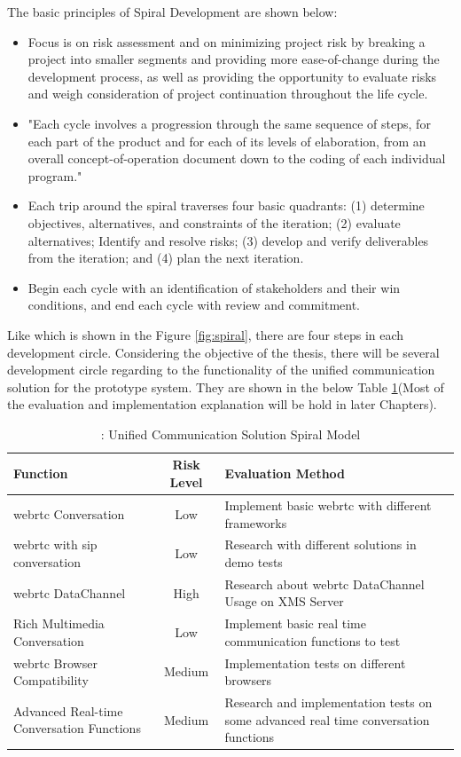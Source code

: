 \noindent The basic principles of Spiral Development are shown below\cite{wiki:software_method}:

\begin{itemize}[topsep=-1em,parsep=0em,itemsep=0em]
    \item Focus is on risk assessment and on minimizing project risk by breaking a project into smaller segments and providing more ease-of-change during the development process, as well as providing the opportunity to evaluate risks and weigh consideration of project continuation throughout the life cycle.
    \item "Each cycle involves a progression through the same sequence of steps, for each part of the product and for each of its levels of elaboration, from an overall concept-of-operation document down to the coding of each individual program."
    \item Each trip around the spiral traverses four basic quadrants: (1) determine objectives, alternatives, and constraints of the iteration; (2) evaluate alternatives; Identify and resolve risks; (3) develop and verify deliverables from the iteration; and (4) plan the next iteration.
    \item Begin each cycle with an identification of stakeholders and their win conditions, and end each cycle with review and commitment.
\end{itemize}

\par Like which is shown in the Figure \ref{fig:spiral}, there are four steps in each development circle. Considering the objective of the thesis, there will be several development circle regarding to the functionality of the unified communication solution for the prototype system. They are shown in the below Table \ref{tab:spiral}(Most of the evaluation and implementation explanation will be hold in later Chapters).

\begin{table}
\caption{\label{tab:spiral}: Unified Communication Solution Spiral Model}
\centering
\begin{tabular}{| p{5cm} | c | p{5cm} |}
\hline
Function & Risk Level & Evaluation Method \\ \hline
\gls{webrtc} Conversation & Low & Implement basic \gls{webrtc} with different frameworks\\ \hline
\gls{webrtc} with \gls{sip} conversation & Low & Research with different solutions in demo tests \\ \hline
\gls{webrtc} DataChannel & High & Research about \gls{webrtc} DataChannel Usage on XMS Server \\ \hline
Rich Multimedia Conversation & Low & Implement basic real time communication functions to test \\ \hline
\gls{webrtc} Browser Compatibility & Medium & Implementation tests on different browsers \\ \hline
Advanced Real-time Conversation Functions & Medium & Research and implementation tests on some advanced real time conversation functions \\
\hline
\end{tabular} 
\end{table}


